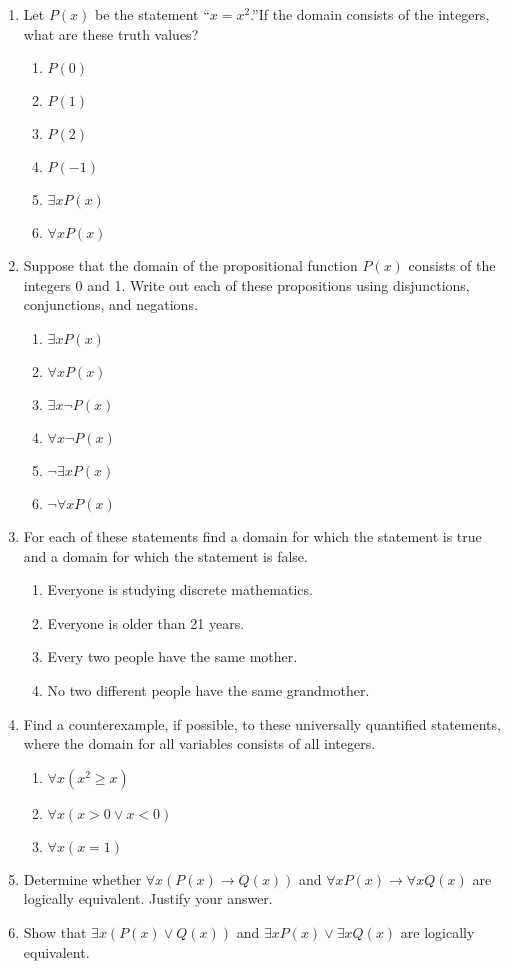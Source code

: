 \documentclass{sig-alternate-05-2015}
\begin{document}
\begin{enumerate}
\item Let $P(x)$ be the statement \textquotedblleft $x = x^2$.\textquotedblright If the domain consists
of the integers, what are these truth values?
\begin{enumerate}
	\item $P(0)$
	\item $P(1)$
	\item $P(2)$
	\item $P(-1)$
	\item $\exists x P(x)$
	\item $\forall x P(x)$
\end{enumerate}

\item Suppose that the domain of the propositional function
$P(x)$ consists of the integers 0 and 1. Write out
each of these propositions using disjunctions, conjunctions,
and negations.
\begin{enumerate}
	\item $\exists x P(x)$
	\item $\forall x P(x)$
	\item $\exists x \neg P(x)$
	\item $\forall x \neg P(x)$
	\item $\neg \exists x P(x)$
	\item $\neg \forall x P(x)$
\end{enumerate}

\item For each of these statements find a domain for which the
statement is true and a domain for which the statement is
false.
\begin{enumerate}
	\item Everyone is studying discrete mathematics.
	\item Everyone is older than 21 years.
	\item Every two people have the same mother.
	\item No two different people have the same grandmother.
\end{enumerate}

\item Find a counterexample, if possible, to these universally
quantified statements, where the domain for all variables
consists of all integers.
\begin{enumerate}
	\item $\forall x (x^2 \ge x)$
	\item $\forall x (x > 0 \vee x < 0)$
	\item $\forall x (x = 1)$
\end{enumerate}

\item Determine whether $\forall x (P(x) \rightarrow Q(x))$ and $\forall x P(x) \rightarrow
\forall x Q(x)$ are logically equivalent. Justify your answer.

\item Show that $\exists x (P(x) \vee Q(x))$ and $\exists x P(x) \vee \exists x Q(x)$ are
logically equivalent.

\end{enumerate}
\end{document}
